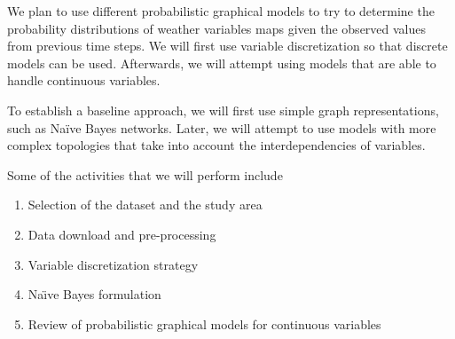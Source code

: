 \documentclass{article}
\begin{document}
We plan to use different probabilistic graphical models to try to determine the probability distributions of weather variables maps given the observed values from previous time steps. We will first use variable discretization so that discrete models can be used. Afterwards, we will attempt using models that are able to handle continuous variables.

To establish a baseline approach, we will first use simple graph representations, such as Naïve Bayes networks. Later, we will attempt to use models with more complex topologies that take into account the interdependencies of variables.

Some of the activities that we will perform include
\begin{enumerate}
\item Selection of the dataset and the study area
\item Data download and pre-processing
\item Variable discretization strategy
\item Na\"\i ve Bayes formulation
\item Review of probabilistic graphical models for continuous variables
\end{enumerate}

\nocite{nasseri2008}



\end{document}
